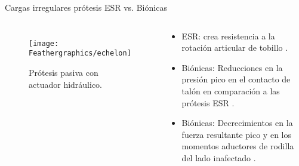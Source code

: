 \documentclass[10pt]{beamer}
\begin{document}
\begin{frame}{Cargas irregulares prótesis ESR vs. Biónicas}

\begin{columns}[t]


\column{60 mm}

\begin{figure}
\begin{centering}
\texttt{[image: Feathergraphics/echelon]}
\par\end{centering}
\caption{Prótesis pasiva con actuador hidráulico.\cite{springking}}
\end{figure}


\column{60 mm}
\begin{exampleblock}{}

\begin{itemize}
\item {\footnotesize{}ESR: crea resistencia a la rotación articular de tobillo
\cite{DeAsha2014}.}{\footnotesize \par}
\item {\footnotesize{}Biónicas: Reducciones en la presión pico en el contacto
de talón en comparación a las prótesis ESR \cite{Hill2013a}.}{\footnotesize \par}
\item {\footnotesize{}Biónicas: Decrecimientos en la fuerza resultante pico
y en los momentos aductores de rodilla del lado inafectado \cite{Grabowski2013}.}{\footnotesize \par}
\end{itemize}
\end{exampleblock}
\end{columns}

\end{frame}
\end{document}
